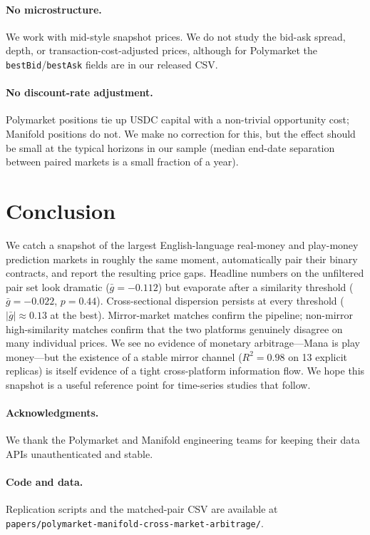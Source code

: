 \documentclass{article}
\begin{document}
\paragraph{No microstructure.} We work with mid-style snapshot prices. We do not study the bid-ask spread, depth, or transaction-cost-adjusted prices, although for Polymarket the \texttt{bestBid}/\texttt{bestAsk} fields are in our released CSV.

\paragraph{No discount-rate adjustment.} Polymarket positions tie up USDC capital with a non-trivial opportunity cost; Manifold positions do not. We make no correction for this, but the effect should be small at the typical horizons in our sample (median end-date separation between paired markets is a small fraction of a year).

\section{Conclusion}

We catch a snapshot of the largest English-language real-money and play-money prediction markets in roughly the same moment, automatically pair their binary contracts, and report the resulting price gaps. Headline numbers on the unfiltered pair set look dramatic ($\bar{g} = -0.112$) but evaporate after a similarity threshold ($\bar{g} = -0.022$, $p=0.44$). Cross-sectional dispersion persists at every threshold ($|\bar{g}| \approx 0.13$ at the best). Mirror-market matches confirm the pipeline; non-mirror high-similarity matches confirm that the two platforms genuinely disagree on many individual prices. We see no evidence of monetary arbitrage---Mana is play money---but the existence of a stable mirror channel ($R^2 = 0.98$ on 13 explicit replicas) is itself evidence of a tight cross-platform information flow. We hope this snapshot is a useful reference point for time-series studies that follow.

\paragraph{Acknowledgments.} We thank the Polymarket and Manifold engineering teams for keeping their data APIs unauthenticated and stable.

\paragraph{Code and data.} Replication scripts and the matched-pair CSV are available at \texttt{papers/polymarket-manifold-cross-market-arbitrage/}.
\end{document}
